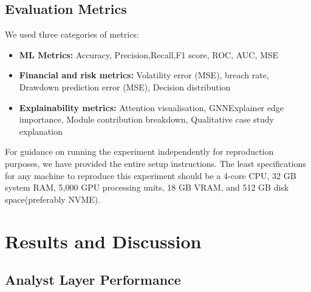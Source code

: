 \documentclass[conference]{IEEEtran}
\begin{document}
\subsection{Evaluation Metrics}
We used three categories of metrics: 
\begin{itemize}
    \item \textbf{ML Metrics:} Accuracy,  Precision,Recall,F1 score, ROC, AUC,  MSE
    \item \textbf{Financial and risk metrics:} Volatility error (MSE), breach rate, Drawdown prediction error (MSE), Decision distribution
    \item \textbf{Explainability metrics:} Attention visualisation, GNNExplainer edge importance, Module contribution breakdown, Qualitative case study explanation
\end{itemize}
For guidance on running the experiment independently for reproduction purposes, we have provided the entire setup instructions.\cite{CodeSetupInstruct} The least specifications for any machine to reproduce this experiment should be a 4-core CPU, 32 GB system RAM, 5,000 GPU processing units, 18 GB VRAM, and 512 GB disk space(preferably NVME).
 
\section{Results and Discussion}
\subsection{Analyst Layer Performance}
\end{document}
